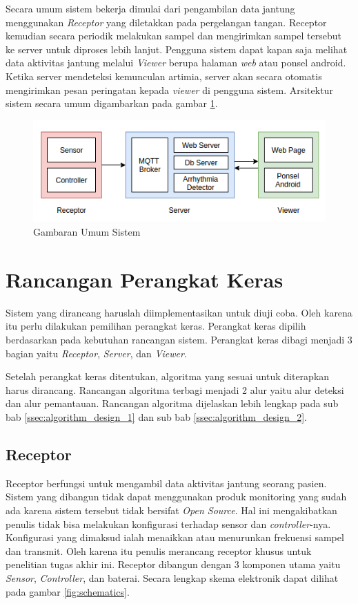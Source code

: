 Secara umum sistem bekerja dimulai dari pengambilan data jantung menggunakan \textit{Receptor} yang diletakkan pada pergelangan tangan. Receptor kemudian secara periodik melakukan sampel dan mengirimkan sampel tersebut ke server untuk diproses lebih lanjut. Pengguna sistem dapat kapan saja melihat data aktivitas jantung melalui \textit{Viewer} berupa halaman \textit{web} atau ponsel android. Ketika server mendeteksi kemunculan artimia, server akan secara otomatis mengirimkan pesan peringatan kepada \textit{viewer} di pengguna sistem. Arsitektur sistem secara umum digambarkan pada gambar \ref{fig:gambar_umum}.

\begin{figure}[H]
	\centering
	\includegraphics[scale=0.8]{images/gambar_umum.png}
    \caption{Gambaran Umum Sistem}
	\label{fig:gambar_umum}
\end{figure}

\section{Rancangan Perangkat Keras}
Sistem yang dirancang haruslah diimplementasikan untuk diuji coba. Oleh karena itu perlu dilakukan pemilihan perangkat keras. Perangkat keras dipilih berdasarkan pada kebutuhan rancangan sistem. Perangkat keras dibagi menjadi 3 bagian yaitu \textit{Receptor}, \textit{Server}, dan \textit{Viewer}.

Setelah perangkat keras ditentukan, algoritma yang sesuai untuk diterapkan harus dirancang. Rancangan algoritma terbagi menjadi 2 alur yaitu alur deteksi dan alur pemantauan. Rancangan algoritma dijelaskan lebih lengkap pada sub bab \ref{ssec:algorithm_design_1} dan sub bab \ref{ssec:algorithm_design_2}.

\subsection{Receptor}
Receptor berfungsi untuk mengambil data aktivitas jantung seorang pasien. Sistem yang dibangun tidak dapat menggunakan produk monitoring yang sudah ada karena sistem tersebut tidak bersifat \textit{Open Source}. Hal ini mengakibatkan penulis tidak bisa melakukan konfigurasi terhadap sensor dan \textit{controller}-nya. Konfigurasi yang dimaksud ialah menaikkan atau menurunkan frekuensi sampel dan transmit. Oleh karena itu penulis merancang receptor khusus untuk penelitian tugas akhir ini. Receptor dibangun dengan 3 komponen utama yaitu \textit{Sensor}, \textit{Controller}, dan baterai. Secara lengkap skema elektronik dapat dilihat pada gambar \ref{fig:schematics}.

